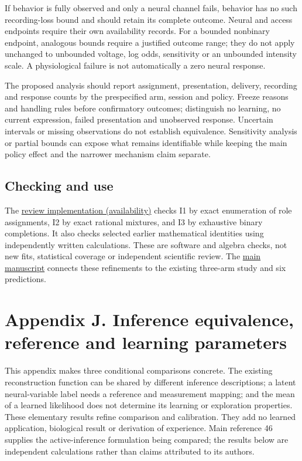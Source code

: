 \documentclass[
  american,
  11pt,
  letterpaper,
]{article}
\begin{document}
If behavior is fully observed and only a neural channel fails, behavior has no such recording-loss bound and should retain its complete outcome. Neural and access endpoints require their own availability records. For a bounded nonbinary endpoint, analogous bounds require a justified outcome range; they do not apply unchanged to unbounded voltage, log odds, sensitivity or an unbounded intensity scale. A physiological failure is not automatically a zero neural response.

The proposed analysis should report assignment, presentation, delivery, recording and response counts by the prespecified arm, session and policy. Freeze reasons and handling rules before confirmatory outcomes; distinguish no learning, no current expression, failed presentation and unobserved response. Uncertain intervals or missing observations do not establish equivalence. Sensitivity analysis or partial bounds can expose what remains identifiable while keeping the main policy effect and the narrower mechanism claim separate.

\enlargethispage{2\baselineskip}

\subsection{Checking and use}\label{checking-and-use}

The \href{https://github.com/v5ma/v5ma.github.io/blob/master/papers/companions/learning-to-feel-v1.0/ARTIFACT-AVAILABILITY.md\#artifact-32}{review implementation (availability)} checks I1 by exact enumeration of role assignments, I2 by exact rational mixtures, and I3 by exhaustive binary completions. It also checks selected earlier mathematical identities using independently written calculations. These are software and algebra checks, not new fits, statistical coverage or independent scientific review. The \href{https://zenodo.org/records/23455801/files/Learning-to-Feel-v1.1.pdf}{main manuscript} connects these refinements to the existing three-arm study and six predictions.

\clearpage
\hypertarget{appendix-j}{}

\section{Appendix J. Inference equivalence, reference and learning parameters}\label{appendix-j.-inference-equivalence-reference-and-learning-parameters}

This appendix makes three conditional comparisons concrete. The existing reconstruction function can be shared by different inference descriptions; a latent neural-variable label needs a reference and measurement mapping; and the mean of a learned likelihood does not determine its learning or exploration properties. These elementary results refine comparison and calibration. They add no learned application, biological result or derivation of experience. Main reference 46 supplies the active-inference formulation being compared; the results below are independent calculations rather than claims attributed to its authors.
\end{document}

